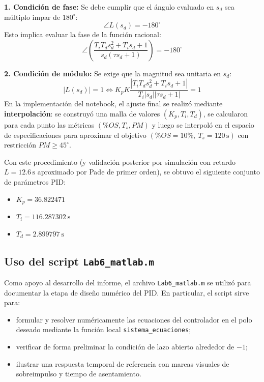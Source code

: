 \documentclass[letterpaper,12pt]{article}
\begin{document}
\textbf{1. Condición de fase:}
Se debe cumplir que el ángulo evaluado en $s_d$ sea múltiplo impar de $180^\circ$:
\begin{equation}
\angle L(s_d) = -180^{\circ}  
\end{equation}
Esto implica evaluar la fase de la función racional:
\begin{equation}
\angle \left( \frac{T_i T_d s_d^2 + T_i s_d + 1}{s_d (\tau s_d + 1)} \right) = -180^{\circ}  
\end{equation}

\textbf{2. Condición de módulo:}
Se exige que la magnitud sea unitaria en $s_d$:
\begin{equation}
|L(s_d)| = 1 \iff K_p K \frac{|T_i T_d s_d^2 + T_i s_d + 1|}{T_i |s_d| |\tau s_d + 1|} = 1  
\end{equation}
En la implementación del notebook, el ajuste final se realizó mediante \textbf{interpolación}: se construyó una malla de valores $(K_p,T_i,T_d)$, se calcularon para cada punto las métricas $(\%OS, T_s, PM)$ y luego se interpoló en el espacio de especificaciones para aproximar el objetivo $(\%OS=10\%,\ T_s=120\,\mathrm{s})$ con restricción $PM\ge 45^\circ$.

Con este procedimiento (y validación posterior por simulación con retardo $L=12.6\,\mathrm{s}$ aproximado por Pade de primer orden), se obtuvo el siguiente conjunto de parámetros PID:

\begin{itemize}
    \item $K_p = 36.822471$
    \item $T_i = 116.287302\ \mathrm{s}$
    \item $T_d = 2.899797\ \mathrm{s}$
\end{itemize}

\subsection*{Uso del script \texttt{Lab6\_matlab.m}}
Como apoyo al desarrollo del informe, el archivo \texttt{Lab6\_matlab.m} se utilizó para documentar la etapa de diseño numérico del PID. En particular, el script sirve para:
\begin{itemize}
    \item formular y resolver numéricamente las ecuaciones del controlador en el polo deseado mediante la función local \texttt{sistema\_ecuaciones};
    \item verificar de forma preliminar la condición de lazo abierto alrededor de \(-1\);
    \item ilustrar una respuesta temporal de referencia con marcas visuales de sobreimpulso y tiempo de asentamiento.
\end{itemize}
\end{document}
